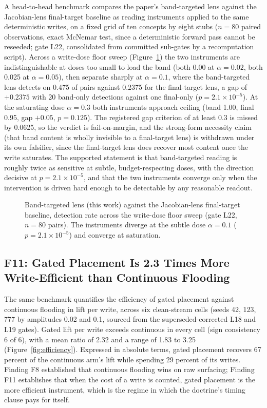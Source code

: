 A head-to-head benchmark compares the paper's band-targeted lens against the Jacobian-lens final-target baseline as reading instruments applied to the same deterministic writes, on a fixed grid of ten concepts by eight stubs ($n=80$ paired observations, exact McNemar test, since a deterministic forward pass cannot be reseeded; gate L22, consolidated from committed sub-gates by a recomputation script). Across a write-dose floor sweep (Figure~\ref{fig:lens_baseline}) the two instruments are indistinguishable at doses too small to load the band (both 0.00 at $\alpha=0.02$, both 0.025 at $\alpha=0.05$), then separate sharply at $\alpha=0.1$, where the band-targeted lens detects on 0.475 of pairs against 0.2375 for the final-target lens, a gap of $+0.2375$ with 20 band-only detections against one final-only ($p=2.1\times10^{-5}$). At the saturating dose $\alpha=0.3$ both instruments approach ceiling (band 1.00, final 0.95, gap $+0.05$, $p=0.125$). The registered gap criterion of at least 0.3 is missed by 0.0625, so the verdict is fail-on-margin, and the strong-form necessity claim (that band content is wholly invisible to a final-target lens) is withdrawn under its own falsifier, since the final-target lens does recover most content once the write saturates. The supported statement is that band-targeted reading is roughly twice as sensitive at subtle, budget-respecting doses, with the direction decisive at $p=2.1\times10^{-5}$, and that the two instruments converge only when the intervention is driven hard enough to be detectable by any reasonable readout.

\begin{figure}[t]
\centering
\resizebox{\columnwidth}{!}{}
\caption{Band-targeted lens (this work) against the Jacobian-lens final-target baseline, detection rate across the write-dose floor sweep (gate L22, $n=80$ pairs). The instruments diverge at the subtle dose $\alpha=0.1$ ($p=2.1\times10^{-5}$) and converge at saturation.}
\label{fig:lens_baseline}
\end{figure}

\subsection{F11: Gated Placement Is 2.3 Times More Write-Efficient than Continuous Flooding}
\label{sec:results:efficiency}

The same benchmark quantifies the efficiency of gated placement against continuous flooding in lift per write, across six clean-stream cells (seeds 42, 123, 777 by amplitudes 0.02 and 0.1, sourced from the superseded-corrected L18 and L19 gates). Gated lift per write exceeds continuous in every cell (sign consistency 6 of 6), with a mean ratio of 2.32 and a range of 1.83 to 3.25 (Figure~\ref{fig:efficiency}). Expressed in absolute terms, gated placement recovers 67 percent of the continuous arm's lift while spending 29 percent of its writes. Finding F8 established that continuous flooding wins on raw surfacing; Finding F11 establishes that when the cost of a write is counted, gated placement is the more efficient instrument, which is the regime in which the doctrine's timing clause pays for itself.

